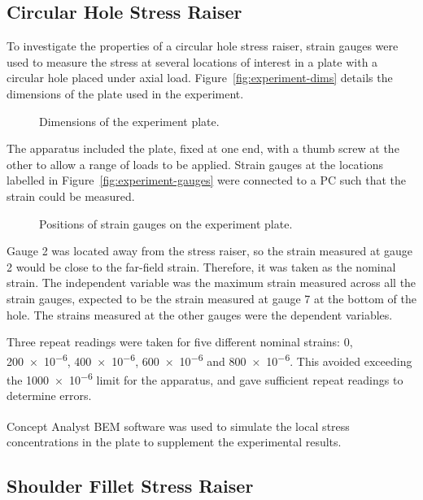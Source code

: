 \documentclass[a4paper,11pt,twocolumn]{article}
\newcommand{\BEM}{\textsc{BEM}\xspace}
\begin{document}
\subsection{Circular Hole Stress Raiser}

To investigate the properties of a circular hole stress raiser, strain gauges
were used to measure the stress at several locations of interest in a plate 
with a circular hole placed under axial load. Figure~\vref{fig:experiment-dims} 
details the dimensions of the plate used in the experiment.

\begin{figure}[h]
    \centering
    \def\svgwidth{\linewidth}
    
    \caption{Dimensions of the experiment plate.}
    \label{fig:experiment-dims}
\end{figure}

The apparatus included the plate, fixed at one end, with a thumb screw at the 
other to allow a range of loads to be applied. Strain gauges at the 
locations labelled in Figure~\vref{fig:experiment-gauges} were connected to a 
\textsc{PC} such that the strain could be measured.

\begin{figure}[h]
    \centering
    \def\svgwidth{\linewidth}
    
    \caption{Positions of strain gauges on the experiment plate.}
    \label{fig:experiment-gauges}
\end{figure}

Gauge 2 was located away from the stress raiser, so the strain measured at gauge
2 would be close to the far-field strain. Therefore, it was taken as the nominal
strain. The independent variable was the maximum strain measured across all the
strain gauges, expected to be the strain measured at gauge 7 at the bottom of
the hole. The strains measured at the other gauges were the dependent variables.

Three repeat readings were taken for five different nominal strains: 0, 
\num{200e-6}, \num{400e-6}, \num{600e-6} and \num{800e-6}. This avoided
exceeding the \num{1000e-6} limit for the apparatus, and gave sufficient repeat
readings to determine errors.

Concept Analyst\textsuperscript{\textregistered} \BEM software was used to
simulate the local stress concentrations in the plate to supplement the
experimental results.

\subsection{Shoulder Fillet Stress Raiser}
\end{document}
